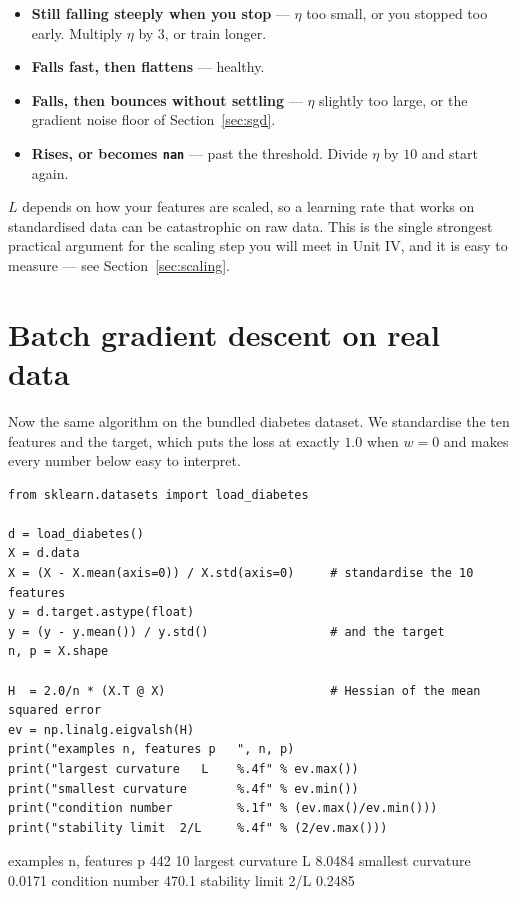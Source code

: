 \documentclass[11pt]{article}
\begin{document}
\begin{itemize}[leftmargin=*]
  \item \textbf{Still falling steeply when you stop} --- $\eta$ too small, or
    you stopped too early. Multiply $\eta$ by $3$, or train longer.
  \item \textbf{Falls fast, then flattens} --- healthy.
  \item \textbf{Falls, then bounces without settling} --- $\eta$ slightly too
    large, or the gradient noise floor of Section~\ref{sec:sgd}.
  \item \textbf{Rises, or becomes \texttt{nan}} --- past the threshold. Divide
    $\eta$ by $10$ and start again.
\end{itemize}

\begin{caution}
$L$ depends on how your features are scaled, so a learning rate that works on
standardised data can be catastrophic on raw data. This is the single strongest
practical argument for the scaling step you will meet in Unit IV, and it is
easy to measure --- see Section~\ref{sec:scaling}.
\end{caution}

\section{Batch gradient descent on real data}
\label{sec:batch}

Now the same algorithm on the bundled diabetes dataset. We standardise the ten
features and the target, which puts the loss at exactly $1.0$ when $w = 0$ and
makes every number below easy to interpret.

\begin{lstlisting}
from sklearn.datasets import load_diabetes

d = load_diabetes()
X = d.data
X = (X - X.mean(axis=0)) / X.std(axis=0)     # standardise the 10 features
y = d.target.astype(float)
y = (y - y.mean()) / y.std()                 # and the target
n, p = X.shape

H  = 2.0/n * (X.T @ X)                       # Hessian of the mean squared error
ev = np.linalg.eigvalsh(H)
print("examples n, features p   ", n, p)
print("largest curvature   L    %.4f" % ev.max())
print("smallest curvature       %.4f" % ev.min())
print("condition number         %.1f" % (ev.max()/ev.min()))
print("stability limit  2/L     %.4f" % (2/ev.max()))
\end{lstlisting}
\begin{codeout}
examples n, features p    442 10
largest curvature   L    8.0484
smallest curvature       0.0171
condition number         470.1
stability limit  2/L     0.2485
\end{codeout}
\end{document}
